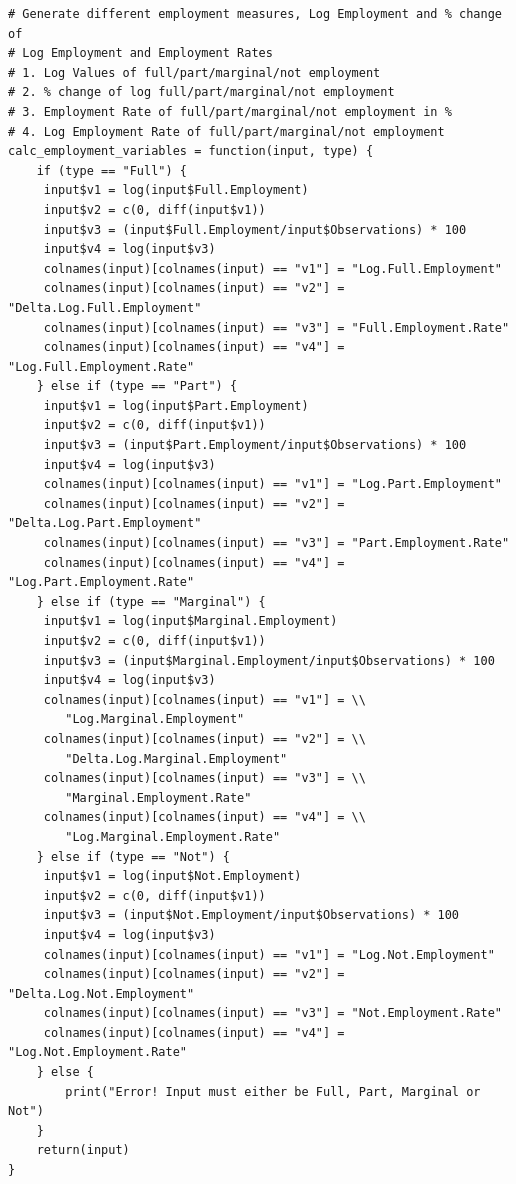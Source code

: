 \documentclass[a4paper]{article}
\begin{document}
{\begin{lstlisting}
# Generate different employment measures, Log Employment and % change of 
# Log Employment and Employment Rates 
# 1. Log Values of full/part/marginal/not employment 
# 2. % change of log full/part/marginal/not employment 
# 3. Employment Rate of full/part/marginal/not employment in % 
# 4. Log Employment Rate of full/part/marginal/not employment
calc_employment_variables = function(input, type) {
    if (type == "Full") {
     input$v1 = log(input$Full.Employment)
     input$v2 = c(0, diff(input$v1))
     input$v3 = (input$Full.Employment/input$Observations) * 100
     input$v4 = log(input$v3)
     colnames(input)[colnames(input) == "v1"] = "Log.Full.Employment"
     colnames(input)[colnames(input) == "v2"] = "Delta.Log.Full.Employment"
     colnames(input)[colnames(input) == "v3"] = "Full.Employment.Rate"
     colnames(input)[colnames(input) == "v4"] = "Log.Full.Employment.Rate"
    } else if (type == "Part") {
     input$v1 = log(input$Part.Employment)
     input$v2 = c(0, diff(input$v1))
     input$v3 = (input$Part.Employment/input$Observations) * 100
     input$v4 = log(input$v3)
     colnames(input)[colnames(input) == "v1"] = "Log.Part.Employment"
     colnames(input)[colnames(input) == "v2"] = "Delta.Log.Part.Employment"
     colnames(input)[colnames(input) == "v3"] = "Part.Employment.Rate"
     colnames(input)[colnames(input) == "v4"] = "Log.Part.Employment.Rate"
    } else if (type == "Marginal") {
     input$v1 = log(input$Marginal.Employment)
     input$v2 = c(0, diff(input$v1))
     input$v3 = (input$Marginal.Employment/input$Observations) * 100
     input$v4 = log(input$v3)
     colnames(input)[colnames(input) == "v1"] = \\ 
     	"Log.Marginal.Employment"
     colnames(input)[colnames(input) == "v2"] = \\ 
     	"Delta.Log.Marginal.Employment"
     colnames(input)[colnames(input) == "v3"] = \\ 
     	"Marginal.Employment.Rate"
     colnames(input)[colnames(input) == "v4"] = \\ 
     	"Log.Marginal.Employment.Rate"
    } else if (type == "Not") {
     input$v1 = log(input$Not.Employment)
     input$v2 = c(0, diff(input$v1))
     input$v3 = (input$Not.Employment/input$Observations) * 100
     input$v4 = log(input$v3)
     colnames(input)[colnames(input) == "v1"] = "Log.Not.Employment"
     colnames(input)[colnames(input) == "v2"] = "Delta.Log.Not.Employment"
     colnames(input)[colnames(input) == "v3"] = "Not.Employment.Rate"
     colnames(input)[colnames(input) == "v4"] = "Log.Not.Employment.Rate"
    } else {
        print("Error! Input must either be Full, Part, Marginal or Not")
    }
    return(input)
}


\end{lstlisting}}
\end{document}
